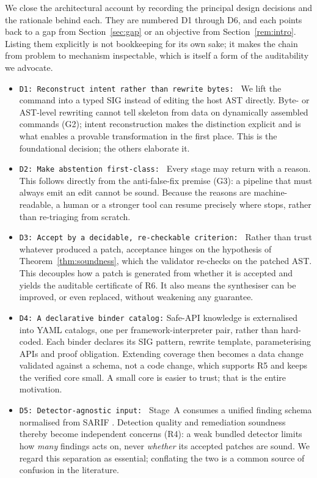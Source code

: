 We close the architectural account by recording the principal design
decisions and the rationale behind each. They are numbered D1 through D6,
and each points back to a gap from Section~\ref{sec:gap} or an objective
from Section~\ref{rem:intro}. Listing them explicitly is not bookkeeping for
its own sake; it makes the chain from problem to mechanism inspectable,
which is itself a form of the auditability we advocate.

\begin{itemize}


\item \texttt{D1: Reconstruct intent rather than rewrite bytes: }
We lift the command into a typed SIG instead of editing the host AST
directly. Byte- or AST-level rewriting cannot tell skeleton from data on
dynamically assembled commands (G2); intent reconstruction makes the
distinction explicit and is what enables a provable transformation in the
first place. This is the foundational decision; the others elaborate it.

\item \texttt{D2: Make abstention first-class: }
Every stage may return \bottom{} with a reason. This follows directly from
the anti-false-fix premise (G3): a pipeline that must always emit an edit
cannot be sound. Because the reasons are machine-readable, a human or a
stronger tool can resume precisely where \irsam{} stops, rather than
re-triaging from scratch.

\item \texttt{D3: Accept by a decidable, re-checkable criterion: }
Rather than trust whatever produced a patch, acceptance hinges on the
hypothesis of Theorem~\ref{thm:soundness}, which the validator re-checks on
the patched AST. This decouples how a patch is generated from whether it is
accepted and yields the auditable certificate of R6. It also means the
synthesiser can be improved, or even replaced, without weakening any
guarantee.

\item \texttt{D4: A declarative binder catalog:}
Safe-API knowledge is externalised into YAML catalogs, one per
framework-interpreter pair, rather than hard-coded. Each binder declares its
SIG pattern, rewrite template, parameterising APIs and proof obligation.
Extending coverage then becomes a data change validated against a schema,
not a code change, which supports R5 and keeps the verified core small. A
small core is easier to trust; that is the entire motivation.

\item \texttt{D5: Detector-agnostic input: }
Stage~A consumes a unified finding schema normalised from SARIF
\citep{sarif2023}. Detection quality and remediation soundness thereby become
independent concerns (R4): a weak bundled detector limits how \emph{many}
findings \irsam{} acts on, never \emph{whether} its accepted patches are
sound. We regard this separation as essential; conflating the two is a
common source of confusion in the literature.


\end{itemize}
